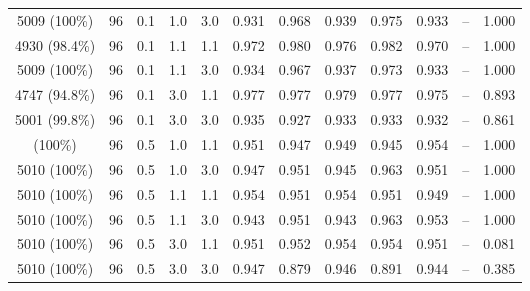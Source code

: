 \begin{longtable}[t]{cccccrrrrrrc}
5009 (100\%) & 96 & 0.1 & 1.0 & 3.0 & 0.931 & 0.968 & 0.939 & 0.975 & 0.933 & -- & 1.000\\
4930 (98.4\%) & 96 & 0.1 & 1.1 & 1.1 & 0.972 & 0.980 & 0.976 & 0.982 & 0.970 & -- & 1.000\\
5009 (100\%) & 96 & 0.1 & 1.1 & 3.0 & 0.934 & 0.967 & 0.937 & 0.973 & 0.933 & -- & 1.000\\
4747 (94.8\%) & 96 & 0.1 & 3.0 & 1.1 & 0.977 & 0.977 & 0.979 & 0.977 & 0.975 & -- & 0.893\\
5001 (99.8\%) & 96 & 0.1 & 3.0 & 3.0 & 0.935 & 0.927 & 0.933 & 0.933 & 0.932 & -- & 0.861\\
\addlinespace
5010 (100\%) & 96 & 0.5 & 1.0 & 1.1 & 0.951 & 0.947 & 0.949 & 0.945 & 0.954 & -- & 1.000\\
5010 (100\%) & 96 & 0.5 & 1.0 & 3.0 & 0.947 & 0.951 & 0.945 & 0.963 & 0.951 & -- & 1.000\\
5010 (100\%) & 96 & 0.5 & 1.1 & 1.1 & 0.954 & 0.951 & 0.954 & 0.951 & 0.949 & -- & 1.000\\
5010 (100\%) & 96 & 0.5 & 1.1 & 3.0 & 0.943 & 0.951 & 0.943 & 0.963 & 0.953 & -- & 1.000\\
5010 (100\%) & 96 & 0.5 & 3.0 & 1.1 & 0.951 & 0.952 & 0.954 & 0.954 & 0.951 & -- & 0.081\\
5010 (100\%) & 96 & 0.5 & 3.0 & 3.0 & 0.947 & 0.879 & 0.946 & 0.891 & 0.944 & -- & 0.385\\
\bottomrule
\end{longtable}
\endgroup{}
